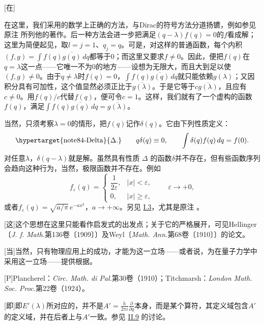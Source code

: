 \documentclass[fontsize=13pt,twoside,openany,headings=normal,parskip=false,bookmarkpackage=false,DIV=calc]{scrbook}
\begin{document}
[在]{在这里，我们采用的数学上正确的方法，与Dirac的符号方法分道扬镳，例如参见原注 \hyperlink{note-1}{} 所列他的著作。后一种方法会进一步把满足$(q-\lambda)f(q)=0$的$f$看成解；这里为简便起见，取$l=j=1$、$q_j=q$。可是，对这样的普通函数，每个内积$(f,\allowbreak g)=\int f(q)\overline{g(q)}\,dq$都等于$0$；而这里又要求$f\ne0$。因此，便把$f(q)$在$q=\lambda$这一点——它唯一不为$0$的地方——设想为无限大，而且大到足以使$(f,\allowbreak g)\ne0$。由于$q\ne\lambda$时$f(q)=0$，$\int f(q)\overline{g(q)}\,dq$就只能依赖$g(\lambda)$；又因积分具有可加性，这个值显然必须正比于$\overline{g(\lambda)}$。于是它等于$c\overline{g(\lambda)}$，且应有$c\ne0$。用$f(q)/c$代替$f(q)$，便可令$c=1$。这样，我们就有了一个虚构的函数$f(q)$，满足$\int f(q)\overline{g(q)}\,dq=\overline{g(\lambda)}$。

当然，只须考察$\lambda=0$的情形，把$f(q)$记作$\delta(q)$。它由下列性质定义：
\[
\text{\hypertarget{note84-Delta}{\(\Delta\).}}\qquad q\delta(q)\equiv0,\qquad
\int\delta(q)f(q)\,dq=f(0).
\]
对任意$\lambda$，$\delta(q-\lambda)$就是解。虽然具有性质 \hyperlink{note84-Delta}{$\Delta$} 的函数$\delta$并不存在，但有些函数序列会趋向这种行为，当然，极限函数并不存在。例如
\[
f_\varepsilon(q)=\begin{cases}\dfrac1{2\varepsilon},&|x|<\varepsilon,\\0,&|x|\ge\varepsilon,\end{cases}
\qquad\varepsilon\to+0,
\]
或者$f_\varepsilon(q)=\sqrt{a/\pi}\,e^{-ax^2}$，$a\to+\infty$。另见 \hyperref[sec:I.3]{I.3}，尤其是原注 \hyperlink{note-32}{}。}

[这]{这个思想在这里只能看作启发式的出发点；关于它的严格展开，可见Hellinger〔\emph{J. f. Math.}第136卷〔1909〕〕及Weyl〔\emph{Math. Ann.}第68卷〔1910〕〕的论文。}

[当]{当然，只有物理应用上的成功，才能为这一立场——或者说，为在量子力学中采用这一立场——提供根据。}

[P]{Plancherel：\emph{Circ. Math. di Pal.}第30卷（1910）；Titchmarsh：\emph{London Math. Soc. Proc.}第22卷（1924）。}

[即]{即$E'(\lambda)$所对应的，并不是$A'=\frac{h}{2\pi i}\frac{\partial}{\partial q}$本身，而是某个算符，其定义域包含$A'$的定义域，并在后者上与$A'$一致。参见 \hyperref[sec:II.9]{II.9} 的讨论。}
\end{document}
